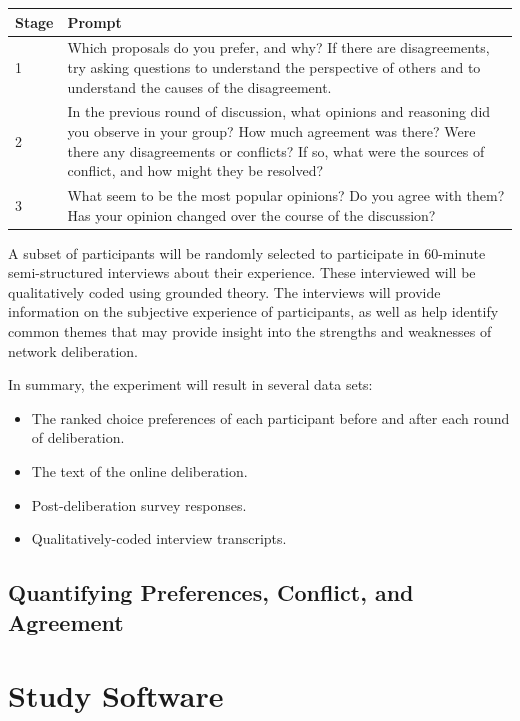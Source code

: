 \begin{table}
\center
\label{tab:prompts}
\begin{tabular}{|p{0.3in}|p{3.6in}|}
\hline
Stage & Prompt \\
\hline
1 &
Which proposals do you prefer, and why?
If there are disagreements, try asking questions to understand the perspective
of others and to understand the causes of the disagreement.
\\
\hline
2 & In the previous round of discussion, what opinions and reasoning did you
observe in your group?
How much agreement was there?
Were there any disagreements or conflicts?
If so, what were the sources of conflict, and how might they be resolved?
\\
\hline
3 &
What seem to be the most popular opinions?
Do you agree with them?
Has your opinion changed over the course of the discussion?
\\
\hline
\end{tabular}
\end{table}

A subset of participants will be randomly selected to participate in
60-minute semi-structured interviews about their experience.
These interviewed will be qualitatively coded using grounded theory.
The interviews will provide information on the subjective experience of
participants, as well as help identify common themes that may provide
insight into the strengths and weaknesses of network deliberation.

In summary, the experiment will result in several data sets:
\begin{itemize}
\item The ranked choice preferences of each participant before and after each round of deliberation.
\item The text of the online deliberation.
\item Post-deliberation survey responses.
\item Qualitatively-coded interview transcripts.
\end{itemize}

\subsection{Quantifying Preferences, Conflict, and Agreement}

\section{Study Software}

